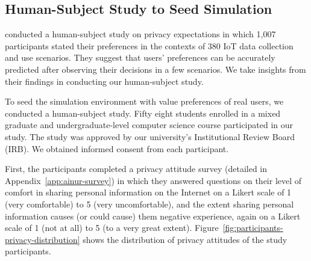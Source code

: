 \subsection{Human-Subject Study to Seed Simulation}
\label{sec:survey}

\citet{Naeini-SOUPS2017-PrivacyExpectations+IOT} conducted a human-subject study on privacy expectations in which 1,007 participants stated their preferences in the contexts of 380 IoT data collection and use scenarios. They suggest that users' preferences can be accurately predicted after observing their decisions in a few scenarios. We take insights from their findings in conducting our human-subject study. 

To seed the simulation environment with value preferences of real users, we conducted a human-subject study. Fifty eight students enrolled in a mixed graduate and undergraduate-level computer science course participated in our study. The study was approved by our university's Institutional Review Board (IRB). We obtained informed consent from each participant. 

First, the participants completed a privacy attitude survey \citep{schnorf2014comparison} (detailed in Appendix~\ref{app:ainur-survey}) in which they answered questions on their level of comfort in sharing personal information on the Internet on a Likert scale of 1 (very comfortable) to 5 (very uncomfortable), and the extent sharing personal information causes (or could cause) them negative experience, again on a Likert scale of 1 (not at all) to 5 (to a very great extent). Figure~\ref{fig:participants-privacy-distribution} shows the distribution of privacy attitudes of the study participants. 

    
